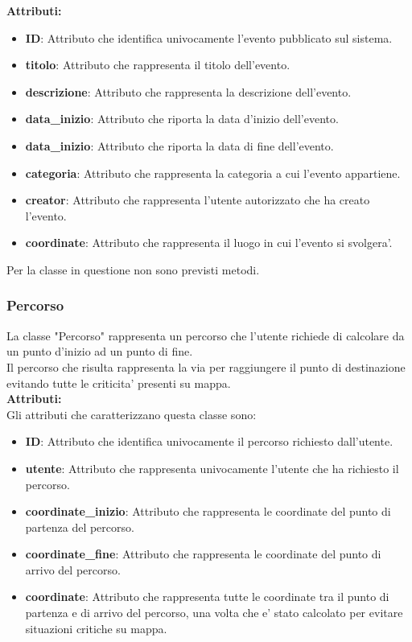 \documentclass{article}
\begin{document}
\textbf{Attributi:}\\
\begin{itemize}
    \item \textbf{ID}: Attributo che identifica univocamente l'evento pubblicato sul sistema.
    \item \textbf{titolo}: Attributo che rappresenta il titolo dell'evento.
    \item \textbf{descrizione}: Attributo che rappresenta la descrizione dell'evento.
    \item \textbf{data\_inizio}: Attributo che riporta la data d'inizio dell'evento.
    \item \textbf{data\_inizio}: Attributo che riporta la data di fine dell'evento.
    \item \textbf{categoria}: Attributo che rappresenta la categoria a cui l'evento appartiene.
    \item \textbf{creator}: Attributo che rappresenta l'utente autorizzato che ha creato l'evento.
    \item \textbf{coordinate}: Attributo che rappresenta il luogo in cui l'evento si svolgera'.\\
\end{itemize}
Per la classe in questione non sono previsti metodi.

\subsubsection{Percorso}

La classe "Percorso" rappresenta un percorso che l'utente richiede di calcolare da un punto d'inizio ad un punto di fine.\\
Il percorso che risulta rappresenta la via per raggiungere il punto di destinazione evitando tutte le criticita' presenti su mappa.\\

\textbf{Attributi:}\\
Gli attributi che caratterizzano questa classe sono:
\begin{itemize}
    \item \textbf{ID}: Attributo che identifica univocamente il percorso richiesto dall'utente.
    \item \textbf{utente}: Attributo che rappresenta univocamente l'utente che ha richiesto il percorso.
    \item \textbf{coordinate\_inizio}: Attributo che rappresenta le coordinate del punto di partenza del percorso.
    \item \textbf{coordinate\_fine}: Attributo che rappresenta le coordinate del punto di arrivo del percorso.
    \item \textbf{coordinate}: Attributo che rappresenta tutte le coordinate tra il punto di partenza e di arrivo del percorso, una volta che e' stato calcolato per evitare situazioni critiche su mappa.
\end{itemize}
\end{document}
